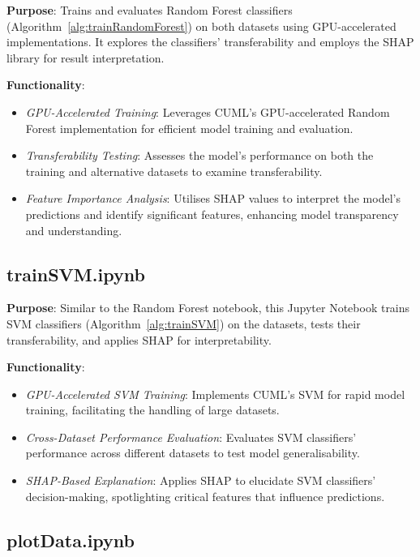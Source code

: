 \textbf{Purpose}: Trains and evaluates Random Forest classifiers (Algorithm~\ref{alg:trainRandomForest}) on both datasets using GPU-accelerated implementations. It explores the classifiers' transferability and employs the SHAP library for result interpretation.

\textbf{Functionality}:

\begin{itemize}
    \item \textit{GPU-Accelerated Training}: Leverages CUML's GPU-accelerated Random Forest implementation for efficient model training and evaluation.
    \item \textit{Transferability Testing}: Assesses the model's performance on both the training and alternative datasets to examine transferability.
    \item \textit{Feature Importance Analysis}: Utilises SHAP values to interpret the model's predictions and identify significant features, enhancing model transparency and understanding.
\end{itemize}

\subsection{trainSVM.ipynb}

\textbf{Purpose}: Similar to the Random Forest notebook, this Jupyter Notebook trains SVM classifiers (Algorithm~\ref{alg:trainSVM}) on the datasets, tests their transferability, and applies SHAP for interpretability.

\textbf{Functionality}:

\begin{itemize}
    \item \textit{GPU-Accelerated SVM Training}: Implements CUML's SVM for rapid model training, facilitating the handling of large datasets.
    \item \textit{Cross-Dataset Performance Evaluation}: Evaluates SVM classifiers' performance across different datasets to test model generalisability.
    \item \textit{SHAP-Based Explanation}: Applies SHAP to elucidate SVM classifiers' decision-making, spotlighting critical features that influence predictions.
\end{itemize}

\subsection{plotData.ipynb}

